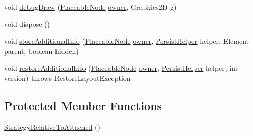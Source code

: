 \begin{DoxyCompactItemize}
void \hyperlink{classorg_1_1tzi_1_1use_1_1gui_1_1views_1_1diagrams_1_1elements_1_1positioning_1_1_strategy_relative_to_attached_ab653f864d6314d0e674e2c702051d42a}{debug\-Draw} (\hyperlink{classorg_1_1tzi_1_1use_1_1gui_1_1views_1_1diagrams_1_1elements_1_1_placeable_node}{Placeable\-Node} \hyperlink{classorg_1_1tzi_1_1use_1_1gui_1_1views_1_1diagrams_1_1elements_1_1positioning_1_1_statefull_position_strategy_ac987ea0c7e5b6ddc09cc5afb41043dfd}{owner}, Graphics2\-D g)
\item 
void \hyperlink{classorg_1_1tzi_1_1use_1_1gui_1_1views_1_1diagrams_1_1elements_1_1positioning_1_1_strategy_relative_to_attached_a43de0af83f2d4fa5c6890f0c5532492e}{dispose} ()
\item 
void \hyperlink{classorg_1_1tzi_1_1use_1_1gui_1_1views_1_1diagrams_1_1elements_1_1positioning_1_1_strategy_relative_to_attached_a520c964659293890e127eba1f135fbe0}{store\-Additional\-Info} (\hyperlink{classorg_1_1tzi_1_1use_1_1gui_1_1views_1_1diagrams_1_1elements_1_1_placeable_node}{Placeable\-Node} \hyperlink{classorg_1_1tzi_1_1use_1_1gui_1_1views_1_1diagrams_1_1elements_1_1positioning_1_1_statefull_position_strategy_ac987ea0c7e5b6ddc09cc5afb41043dfd}{owner}, \hyperlink{classorg_1_1tzi_1_1use_1_1gui_1_1util_1_1_persist_helper}{Persist\-Helper} helper, Element parent, boolean hidden)
\item 
void \hyperlink{classorg_1_1tzi_1_1use_1_1gui_1_1views_1_1diagrams_1_1elements_1_1positioning_1_1_strategy_relative_to_attached_a6874a9e2822616e40fc52f901e483f95}{restore\-Additional\-Info} (\hyperlink{classorg_1_1tzi_1_1use_1_1gui_1_1views_1_1diagrams_1_1elements_1_1_placeable_node}{Placeable\-Node} \hyperlink{classorg_1_1tzi_1_1use_1_1gui_1_1views_1_1diagrams_1_1elements_1_1positioning_1_1_statefull_position_strategy_ac987ea0c7e5b6ddc09cc5afb41043dfd}{owner}, \hyperlink{classorg_1_1tzi_1_1use_1_1gui_1_1util_1_1_persist_helper}{Persist\-Helper} helper, int version)  throws Restore\-Layout\-Exception 
\end{DoxyCompactItemize}
\subsection*{Protected Member Functions}
\begin{DoxyCompactItemize}
\item 
\hyperlink{classorg_1_1tzi_1_1use_1_1gui_1_1views_1_1diagrams_1_1elements_1_1positioning_1_1_strategy_relative_to_attached_aad04cb4862ac1ad2638a57be4fc72dee}{Strategy\-Relative\-To\-Attached} ()
\end{DoxyCompactItemize}
